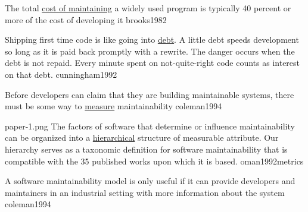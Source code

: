 \documentclass{article}
\begin{document}


  {The total \ul{cost of maintaining} a widely used program is typically 40 percent or more of the cost of developing it}
  {brooks1982}

  {Shipping first time code is like going into \ul{debt}. A little debt speeds development so long as it is paid back promptly with a rewrite. The danger occurs when the debt is not repaid. Every minute spent on not-quite-right code counts as interest on that debt.}
  {cunningham1992}

  {Before developers can claim that they are building maintainable systems, there must be some way to \ul{measure} maintainability}
  {coleman1994}

\qte
  {paper-1.png}
  {The factors of software that determine or influence maintainability can be organized into a \ul{hierarchical} structure of measurable attribute. Our hierarchy serves as a taxonomic definition for software maintainability that is compatible with the 35 published works upon which it is based.}
  {oman1992metrics}



  {A software maintainability model is only useful if it can provide developers and maintainers in an industrial setting with more information about the system}
  {coleman1994}
\end{document}
